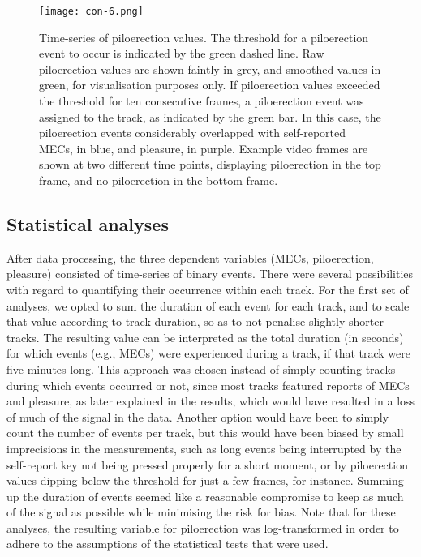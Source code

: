 \begin{figure}[t!]
\texttt{[image: con-6.png]}
\centering
\caption{Time-series of piloerection values. The threshold for a piloerection event to occur is indicated by the green dashed line. Raw piloerection values are shown faintly in grey, and smoothed values in green, for visualisation purposes only. If piloerection values exceeded the threshold for ten consecutive frames, a piloerection event was assigned to the track, as indicated by the green bar. In this case, the piloerection events considerably overlapped with self-reported MECs, in blue, and pleasure, in purple. Example video frames are shown at two different time points, displaying piloerection in the top frame, and no piloerection in the bottom frame.}
\label{fig:con-6}
\end{figure}

\subsection{Statistical analyses}

After data processing, the three dependent variables (MECs, piloerection, pleasure) consisted of time-series of binary events. There were several possibilities with regard to quantifying their occurrence within each track. For the first set of analyses, we opted to sum the duration of each event for each track, and to scale that value according to track duration, so as to not penalise slightly shorter tracks. The resulting value can be interpreted as the total duration (in seconds) for which events (e.g., MECs) were experienced during a track, if that track were five minutes long. This approach was chosen instead of simply counting tracks during which events occurred or not, since most tracks featured reports of MECs and pleasure, as later explained in the results, which would have resulted in a loss of much of the signal in the data. Another option would have been to simply count the number of events per track, but this would have been biased by small imprecisions in the measurements, such as long events being interrupted by the self-report key not being pressed properly for a short moment, or by piloerection values dipping below the threshold for just a few frames, for instance. Summing up the duration of events seemed like a reasonable compromise to keep as much of the signal as possible while minimising the risk for bias. Note that for these analyses, the resulting variable for piloerection was log-transformed in order to adhere to the assumptions of the statistical tests that were used.

